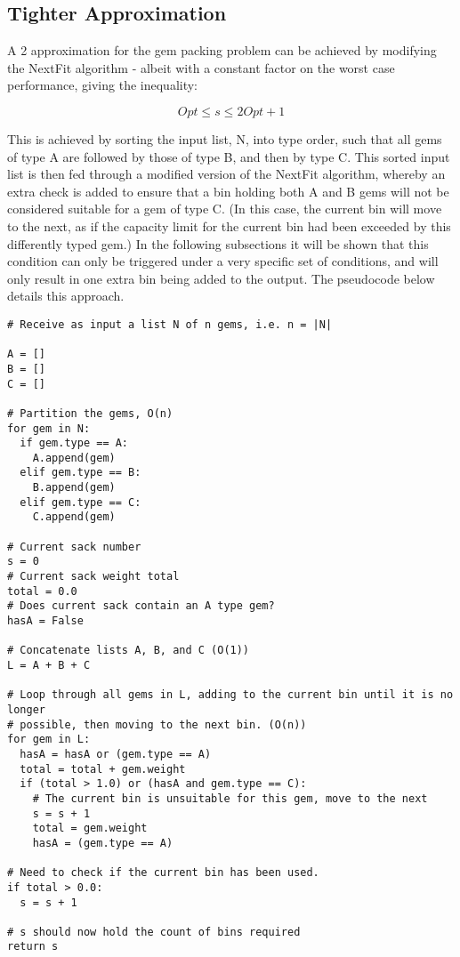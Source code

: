 \documentclass[paper=a4, fontsize=12pt]{article}
\begin{document}
\subsection{Tighter Approximation}

A 2 approximation for the gem packing problem can be achieved by modifying the
NextFit algorithm - albeit with a constant factor on the worst case
performance, giving the inequality:

\begin{displaymath}
Opt \leq s \leq 2 Opt + 1
\end{displaymath}

This is achieved by sorting the input list, N, into type order, such that all
gems of type A are followed by those of type B, and then by type C. This sorted
input list is then fed through a modified version of the NextFit algorithm,
whereby an extra check is added to ensure that a bin holding both A and B gems
will not be considered suitable for a gem of type C. (In this case, the current
bin will move to the next, as if the capacity limit for the current bin had
been exceeded by this differently typed gem.) In the following subsections it
will be shown that this condition can only be triggered under a very specific
set of conditions, and will only result in one extra bin being added to the
output. The pseudocode below details this approach.

\begin{lstlisting}
# Receive as input a list N of n gems, i.e. n = |N|

A = []
B = []
C = []

# Partition the gems, O(n)
for gem in N:
  if gem.type == A:
    A.append(gem)
  elif gem.type == B:
    B.append(gem)
  elif gem.type == C:
    C.append(gem)

# Current sack number
s = 0
# Current sack weight total
total = 0.0
# Does current sack contain an A type gem?
hasA = False

# Concatenate lists A, B, and C (O(1))
L = A + B + C

# Loop through all gems in L, adding to the current bin until it is no longer
# possible, then moving to the next bin. (O(n))
for gem in L:
  hasA = hasA or (gem.type == A)
  total = total + gem.weight
  if (total > 1.0) or (hasA and gem.type == C):
    # The current bin is unsuitable for this gem, move to the next
    s = s + 1
    total = gem.weight
    hasA = (gem.type == A)

# Need to check if the current bin has been used.
if total > 0.0:
  s = s + 1

# s should now hold the count of bins required
return s
\end{lstlisting}
\end{document}
